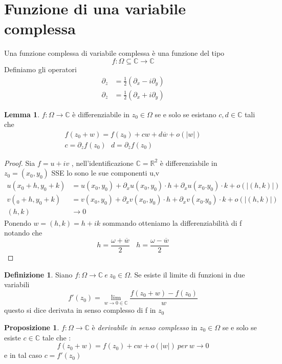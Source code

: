 \documentclass{article}
\theoremstyle{definition}
\newtheorem*{definizione}{Definizione}
\newtheorem*{proposizione}{Proposizione}
\newtheorem*{lemma}{Lemma}
\newcommand{\R}{\mathbb{R}}
\newcommand{\C}{\mathbb{C}}
\newcommand{\norm}[1]{|#1|}
\begin{document}
\section{Funzione di una variabile complessa}
Una funzione complessa di variabile complessa è una funzione del tipo 
$$f:\Omega \subseteq \mathbb{C} \rightarrow \mathbb{C}$$
Definiamo gli operatori 
\begin{align*}
	\partial_z&=\frac{1}{2}(\partial_x - i \partial_y)\\
		\partial_{\overline{z}}&=\frac{1}{2}(\partial_x + i \partial_y)
\end{align*}
	\begin{lemma}
		$f: \Omega \rightarrow\C$ è differenziabile in $z_0\in \Omega$ se e solo se esistano $c,d\in \C$ tali che 
		\begin{align*}
		f(z_0+w)=f(z_0)+cw+d\overline{w}+o(\norm{w})\\
		c=\partial_zf(z_0) \ \ \ d=\partial_{\overline{z}}f(z_0)
			\end{align*}
	\end{lemma}
	\begin{proof}
		Sia $f=u+iv$ , nell'identificazione $\C=\R^2$ è differenziabile in $z_0=(x_0,y_0)$ SSE lo sono le sue componenti u,v
		\begin{align*}
			u(x_0+h,y_0+k)&=u(x_0,y_0)+\partial_xu(x_0,y_0) \cdot h +\partial_xu(x_0.y_0) \cdot k+o(\norm{(h,k)})\\
			v(_0+h,y_0+k)&=v(x_0,y_0)+\partial_xv(x_0,y_0) \cdot h +\partial_xv(x_0.y_0) \cdot k+o(\norm{(h,k)}) \\ 
			(h,k)&\rightarrow 0
		\end{align*}
		Ponendo $w=(h,k)=h+ik$ sommando otteniamo la differenziabilità di f notando che 
		$$h=\frac{\omega+\overline{w}}{2} \ \ \  \ h=\frac{\omega-\overline{w}}{2}  $$
	\end{proof}
	\begin{definizione}
		Siano $f:\Omega\rightarrow \C \ e \ z_0 \in \Omega$. Se esiste il limite di funzioni in due variabili 
		$$f'(z_0)=\lim_{w\rightarrow 0\in \C}\frac{f(z_0+w)-f(z_0)}{w}$$ questo si dice derivata in senso complesso di f in $z_0$
	\end{definizione}
	\begin{proposizione}
		$f:\Omega \rightarrow \C$ è \textit{derivabile in senso complesso} in $z_0 \in \Omega $ se e solo se esiste $c \in \C$ tale che :
		$$f(z_0+w)=f(z_0)+cw+o(\norm{w}) \ per \ w \rightarrow 0$$ e in tal caso $c=f'(z_0)$
	\end{proposizione}
\end{document}

